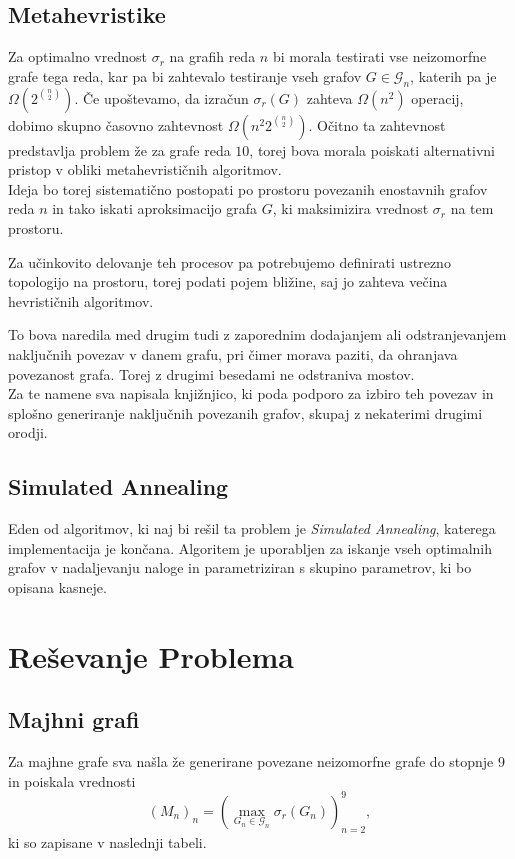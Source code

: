 \documentclass[ letterpaper, titlepage, fleqn]{article}
\begin{document}
\subsection{Metahevristike}
Za optimalno vrednost $\sigma_r$ na grafih reda $n$ bi morala testirati vse neizomorfne
grafe tega reda, kar pa bi zahtevalo testiranje vseh grafov $G \in \mathscr{G}_n$, 
katerih pa je $\Omega\left(2^{\binom{n}{2}}\right)$. Če upoštevamo, da izračun $\sigma_r(G)$ 
zahteva $\Omega(n^2)$ operacij, dobimo skupno časovno zahtevnost $\Omega\left(n^2 2^{\binom{n}{2}}\right)$.
Očitno ta zahtevnost predstavlja problem že za grafe reda $10$, 
torej bova morala poiskati alternativni pristop v obliki metahevrističnih algoritmov. \\

Ideja bo torej sistematično postopati po prostoru povezanih enostavnih grafov reda $n$ in 
tako iskati aproksimacijo grafa $G$, ki maksimizira vrednost $\sigma_r$ na tem prostoru.

Za učinkovito delovanje teh procesov pa potrebujemo definirati ustrezno topologijo 
na prostoru, torej podati pojem bližine, saj jo zahteva večina hevrističnih algoritmov.

To bova naredila med drugim tudi z zaporednim dodajanjem ali odstranjevanjem naključnih povezav v 
danem grafu, pri čimer morava paziti, da ohranjava povezanost grafa. 
Torej z drugimi besedami ne odstraniva mostov.\\
Za te namene sva napisala knjižnjico, ki poda podporo za izbiro teh povezav
in splošno generiranje naključnih povezanih grafov, skupaj z nekaterimi drugimi orodji.

\subsection{Simulated Annealing}
Eden od algoritmov, ki naj bi rešil ta problem je {\em Simulated Annealing}, 
katerega implementacija je končana.
Algoritem je uporabljen za iskanje vseh optimalnih grafov v nadaljevanju naloge in parametriziran
s skupino parametrov, ki bo opisana kasneje.

\section{Reševanje Problema}

\subsection{Majhni grafi}
Za majhne grafe sva našla že generirane povezane neizomorfne grafe do stopnje 9 in poiskala vrednosti 
$$(M_n)_{n} = (\max_{G_n \in \mathscr{G}_n} \sigma_r(G_n))_{n=2}^9,$$
ki so zapisane v naslednji tabeli.
\end{document}
